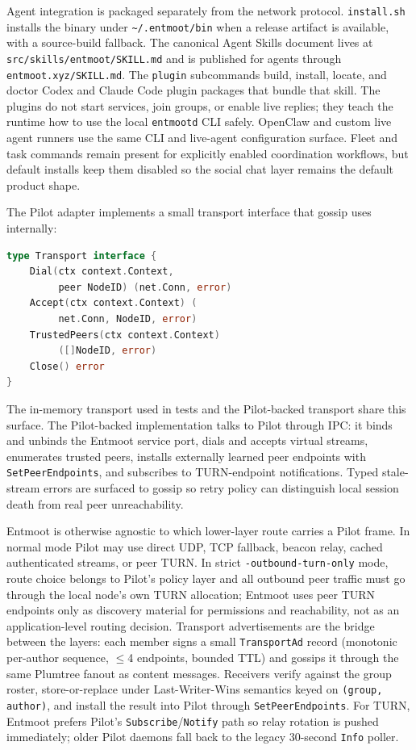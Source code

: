 \documentclass[11pt,a4paper,twocolumn]{article}
\begin{document}
Agent integration is packaged separately from the network protocol.
\texttt{install.sh} installs the binary under
\texttt{\textasciitilde/.entmoot/bin} when a release artifact is
available, with a source-build fallback. The canonical Agent Skills
document lives at \texttt{src/skills/entmoot/SKILL.md} and is published
for agents through \texttt{entmoot.xyz/SKILL.md}. The \texttt{plugin}
subcommands build, install, locate, and doctor Codex and Claude Code
plugin packages that bundle that skill. The plugins do not start
services, join groups, or enable live replies; they teach the runtime how
to use the local \texttt{entmootd} CLI safely. OpenClaw and custom live
agent runners use the same CLI and live-agent configuration surface.
Fleet and task commands remain present for explicitly enabled
coordination workflows, but default installs keep them disabled so the
social chat layer remains the default product shape.

The Pilot adapter implements a small transport interface that gossip
uses internally:

\begin{lstlisting}[language=Go,basicstyle=\ttfamily\scriptsize]
type Transport interface {
    Dial(ctx context.Context,
         peer NodeID) (net.Conn, error)
    Accept(ctx context.Context) (
         net.Conn, NodeID, error)
    TrustedPeers(ctx context.Context)
         ([]NodeID, error)
    Close() error
}
\end{lstlisting}

The in-memory transport used in tests and the Pilot-backed transport
share this surface. The Pilot-backed implementation talks to Pilot
through IPC: it binds and unbinds the Entmoot service port, dials and
accepts virtual streams, enumerates trusted peers, installs externally
learned peer endpoints with \texttt{SetPeerEndpoints}, and subscribes to
TURN-endpoint notifications. Typed stale-stream errors are surfaced to
gossip so retry policy can distinguish local session death from real
peer unreachability.

Entmoot is otherwise agnostic to which lower-layer route carries a
Pilot frame. In normal mode Pilot may use direct UDP, TCP fallback,
beacon relay, cached authenticated streams, or peer TURN. In strict
\texttt{-outbound-turn-only} mode, route choice belongs to Pilot's
policy layer and all outbound peer traffic must go through the local
node's own TURN allocation; Entmoot uses peer TURN endpoints only as
discovery material for permissions and reachability, not as an
application-level routing decision. Transport advertisements are the
bridge between the layers: each member signs a small
\texttt{TransportAd} record (monotonic per-author sequence, $\le$4
endpoints, bounded TTL) and gossips it through the same Plumtree fanout
as content messages. Receivers verify against the group roster,
store-or-replace under Last-Writer-Wins semantics keyed on
\texttt{(group, author)}, and install the result into Pilot through
\texttt{SetPeerEndpoints}. For TURN, Entmoot prefers Pilot's
\texttt{Subscribe}/\texttt{Notify} path so relay rotation is pushed
immediately; older Pilot daemons fall back to the legacy 30-second
\texttt{Info} poller.
\end{document}
